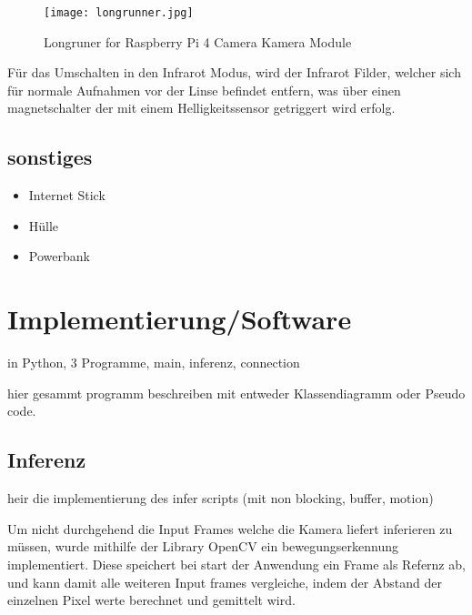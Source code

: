 \begin{figure}[H]
    \centering
    \texttt{[image: longrunner.jpg]}
    \caption{Longruner for Raspberry Pi 4 Camera Kamera Module}
    \label{fig:rpicam}
\end{figure}

Für das Umschalten in den Infrarot Modus, wird der Infrarot Filder, welcher sich 
für normale Aufnahmen vor der Linse befindet entfern, was über einen magnetschalter 
der mit einem Helligkeitssensor getriggert wird erfolg.

 

\subsection*{sonstiges}
\begin{itemize}
    \item Internet Stick%
    \item Hülle
    \item Powerbank
\end{itemize}

\section{Implementierung/Software}

in Python, 3 Programme, main, inferenz, connection

hier gesammt programm beschreiben mit entweder 
Klassendiagramm oder Pseudo code.

\subsection*{Inferenz}

heir die implementierung des infer scripts (mit non blocking, 
buffer, motion)


Um nicht durchgehend die Input Frames welche die Kamera liefert inferieren zu 
müssen, wurde mithilfe der Library OpenCV ein bewegungserkennung 
implementiert. Diese speichert bei start der Anwendung ein Frame 
als Refernz ab, und kann damit alle weiteren Input frames vergleiche, 
indem der Abstand der einzelnen Pixel werte berechnet und gemittelt wird.





